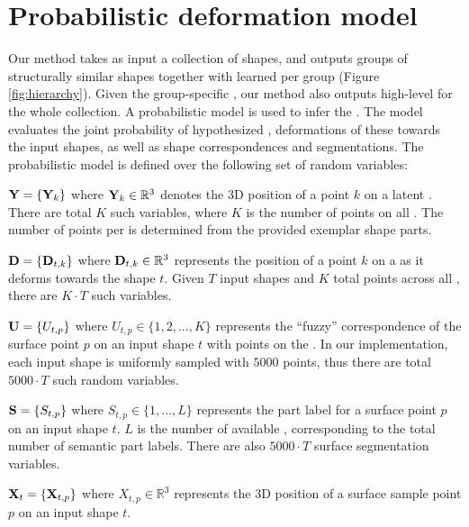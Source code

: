 \section{Probabilistic deformation model}
\label{sec:part_representation_learning}

Our method takes as input a collection of shapes, and outputs groups of structurally similar shapes together with learned  per group (Figure \ref{fig:hierarchy}). Given the group-specific , our method also outputs high-level  for the whole collection. A probabilistic model is used to infer the . The model evaluates the joint probability of hypothesized , deformations of these  towards the input shapes, as well as shape correspondences and segmentations. The probabilistic model is defined over the following set of random variables:
\begin{description}[leftmargin=1em]
\setlength{\itemsep}{4pt}
\setlength{\parskip}{0pt}
\setlength{\parsep}{0pt}
\item[Part templates] $\mathbf{Y} = \{\mathbf{Y}_k\}$ where $\mathbf{Y}_k \in  \mathbb{R}^3$ denotes the 3D position of a point $k$ on a latent . There are total $K$ such variables, where $K$ is the  number of points on all . The number of points per  is determined from the provided exemplar shape parts. 
\item[Deformations] $\mathbf{D} = \{\mathbf{D}_{t,k}\}$ where $\mathbf{D}_{t,k} \in \mathbb{R}^3$ represents the position of a point $k$ on a  as it deforms towards the shape $t$. Given $T$ input shapes and $K$ total points across all , there are  $K \cdot T$ such variables. 
\item[Point correspondences] $\mathbf{U} = \{U_{t,p}\}$ where $U_{t,p} \in \{1,2,...,K\}$ represents the ``fuzzy'' correspondence of the surface point $p$ on an input shape $t$ with points on the . In our implementation, each input shape is uniformly sampled with $5000$ points, thus there are total  $5000 \cdot T$ such random variables. 
\item[Surface segmentation] $\mathbf{S} = \{S_{t,p}\}$ where $S_{t,p} \in \{1,...,L\}$ represents the part label for a surface point $p$ on an input shape $t$. $L$ is the number of available , corresponding to the total number of semantic part labels. There are also $5000 \cdot T$ surface segmentation variables. 
\item[Input surface points] $\mathbf{X}_t = \{ \mathbf{X}_{t,p} \}$ where $X_{t,p} \in \mathbb{R}^3$ represents the 3D position of a surface sample point $p$ on an input shape $t$. 
\end{description}



